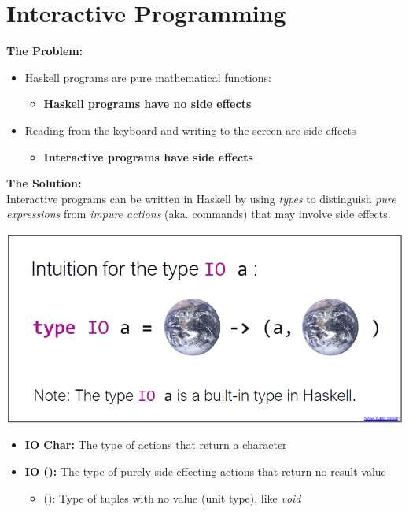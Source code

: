
\section{Interactive Programming}
\textbf{The Problem:}
\begin{itemize}
    \item Haskell programs are pure mathematical functions:
    \begin{itemize}
        \item \textbf{Haskell programs have no side effects}
    \end{itemize}
    \item Reading from the keyboard and writing to the screen are side effects
    \begin{itemize}
        \item \textbf{Interactive programs have side effects}
    \end{itemize}
\end{itemize}
\textbf{The Solution:}\\ 
Interactive programs can be written in Haskell by using \textit{types} to distinguish \textit{pure expressions} from \textit{impure actions} (aka. commands) that may involve side effects.\\ 
\begin{center}
    \includegraphics[width=0.6\linewidth]{img/io_type.png}
\end{center}
\begin{itemize}
    \item \textbf{IO Char:} The type of actions that return a character
    \item \textbf{IO ():} The type of purely side effecting actions that return no result value
    \begin{itemize}
        \item (): Type of tuples with no value (unit type), like \textit{void}
    \end{itemize}
\end{itemize}

